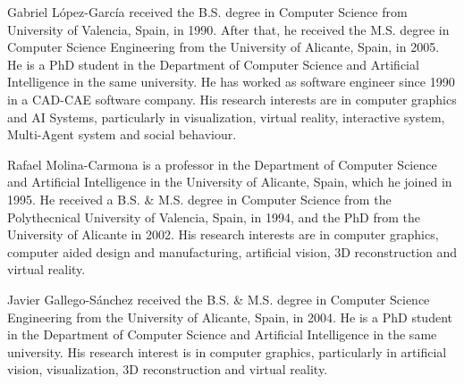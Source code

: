 \documentclass[10pt,journal,letterpaper,compsoc]{IEEEtran}
\begin{document}

\begin{IEEEbiographynophoto}{Gabriel López-García}
received the B.S. degree in Computer Science from University of Valencia, Spain, in 1990. After that, he received the M.S. degree in Computer Science Engineering from the University of Alicante, Spain, in 2005. He is a PhD student in the Department of Computer Science and Artificial Intelligence in the same university. He has worked as software engineer since 1990 in a CAD-CAE software company. His research interests are in computer graphics and AI Systems, particularly in visualization, virtual reality, interactive system, Multi-Agent system and social behaviour.
\end{IEEEbiographynophoto}


\begin{IEEEbiographynophoto}{Rafael Molina-Carmona}
is a professor in the Department of Computer Science and Artificial Intelligence in the University of Alicante, Spain, which he joined in 1995. He received a B.S. \& M.S. degree in Computer Science from the Polythecnical University of Valencia, Spain, in 1994, and the PhD from the University of Alicante in 2002. His research interests are in computer graphics, computer aided design and manufacturing, artificial vision, 3D reconstruction and virtual reality.
\end{IEEEbiographynophoto}


\begin{IEEEbiographynophoto}{Javier Gallego-Sánchez}
received the B.S. \& M.S. degree in Computer Science Engineering from the University of Alicante, Spain, in 2004. He is a PhD student in the Department of Computer Science and Artificial Intelligence in the same university. His research interest is in computer graphics, particularly in artificial vision, visualization, 3D reconstruction and virtual reality.
\end{IEEEbiographynophoto}







\end{document}
